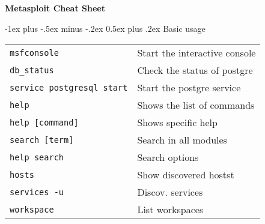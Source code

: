 \documentclass[10pt,landscape]{article}
\makeatletter
\renewcommand{\section}{\@startsection{section}{1}{0mm}%
                                {-1ex plus -.5ex minus -.2ex}%
                                {0.5ex plus .2ex}%
                                {\normalfont\large\bfseries}}
\makeatother
\begin{document}
\raggedright
\footnotesize
\begin{multicols}{2}


\setlength{\premulticols}{1pt}
\setlength{\postmulticols}{1pt}
\setlength{\multicolsep}{1pt}
\setlength{\columnsep}{2pt}

\begin{center}
     \Large{\textbf{Metasploit Cheat Sheet}} \\
\end{center}

\section{Basic usage}
\begin{tabular}{@{}ll@{}}
\verb!msfconsole!    & Start the interactive console \\
\verb!db_status!  & Check the status of postgre\\
\verb!service postgresql start! & Start the postgre service \\
\verb!help!  & Shows the list of commands\\
\verb!help [command]!  & Shows specific help\\ 
\verb!search [term]!  & Search in all modules\\
\verb!help search!  & Search options\\
\verb!hosts!  & Show discovered hostst\\
\verb!services -u!  & Discov. services\\
\verb!workspace!  & List workspaces\\
\end{tabular}


\end{multicols}
\end{document}
